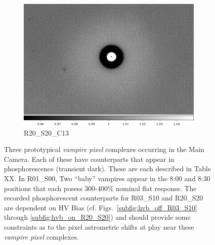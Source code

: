 \begin{figure}[!htbp]
\begin{subfigure}{0.3\textwidth}
     \includegraphics[width=\textwidth]{figures/vamp_desc/vamp_desc_ffresp_R20S20.png} 
     \caption{R20\_S20\_C13}
     \label{subfig:vamp_desc_R20_S20}
 \end{subfigure}  
 \newline
\caption{Three prototypical {\it vampire pixel} complexes occurring in the Main Camera. Each of these have counterparts that appear in phosphorescence (transient dark). These are each described in Table XX. In R01\_S00, Two ``baby'' vampires appear in the 8:00 and 8:30 positions that each posess 300-400\% nominal flat response. The recorded phosphorescent counterparts for R03\_S10 and R20\_S20 are dependent on HV Bias (cf. Figs.~\ref{subfig:hvb_off_R03_S10} through \ref{subfig:hvb_on_R20_S20}) and should provide some constraints as to the pixel astrometric shifts at play near these {\it vampire pixel} complexes.}
\label{fig:vamp:ffresp}
\end{figure}



